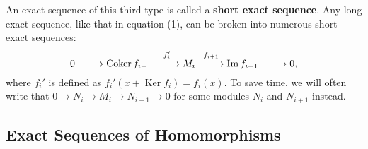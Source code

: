 \documentclass[11pt]{article}
\newcommand{\Ker}{\operatorname{Ker}}
\newcommand{\Coker}{\operatorname{Coker}}
\renewcommand{\longrightarrow}{\xrightarrow{\hspace*{0.7cm}}}
\begin{document}
An exact sequence of this third type is called a \textbf{short exact sequence}. Any long exact sequence, like that in equation (1), can be broken into numerous short exact sequences:
\[
	0 \longrightarrow \Coker f_{i - 1} \stackrel{f_{i}'}{\longrightarrow} M_{i} \stackrel{f_{i + 1}}{\longrightarrow} \Im f_{i + 1} \longrightarrow 0,
\]
where $f_{i}'$ is defined as $f_{i}'(x + \Ker f_{i}) = f_{i}(x)$. To save time, we will often write that $0 \to N_{i} \to M_{i} \to N_{i + 1} \to 0$ for some modules $N_{i}$ and $N_{i + 1}$ instead.


\subsection{Exact Sequences of Homomorphisms}
\end{document}
